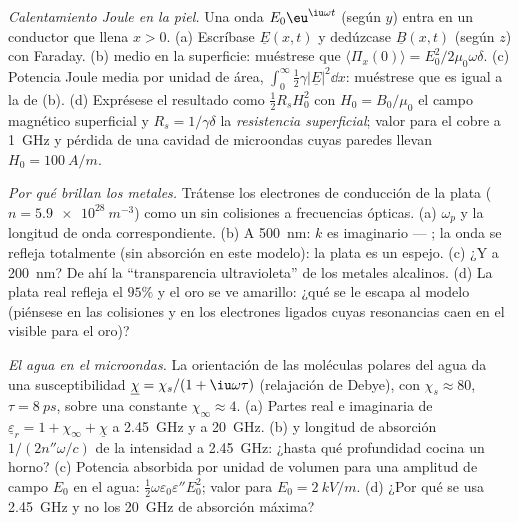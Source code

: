 \begin{exercise}[$\star\star\star$]\label{exo:b2:waves-in-media:10}
\emph{Calentamiento Joule en la piel.} Una onda $E_0\eu^{\iu\omega t}$ (según $y$)
entra en un conductor que llena $x > 0$. (a) Escríbase $\underline E(x, t)$ y dedúzcase
$\underline B(x, t)$ (según $z$) con Faraday. (b)  medio en la
superficie: muéstrese que $\langle\Pi_x(0)\rangle = E_0^2/2\mu_0\omega\delta$. (c) Potencia
Joule media por unidad de área, $\int_0^\infty\tfrac12\gamma|\underline E|^2\dd x$: muéstrese que es igual a
la de (b). (d) Exprésese el resultado como $\tfrac12R_sH_0^2$ con $H_0 = B_0/\mu_0$ el
campo magnético superficial y $R_s = 1/\gamma\delta$ la \emph{resistencia
superficial}; valor para el cobre a \qty{1}{GHz} y pérdida de una
cavidad de microondas cuyas paredes llevan $H_0 = \qty{100}{A/m}$.
\end{exercise}

\begin{exercise}[$\star\star\star$]\label{exo:b2:waves-in-media:11}
\emph{Por qué brillan los metales.} Trátense los electrones de conducción de la plata ($n =
\qty{5.9e28}{m^{-3}}$) como un  sin colisiones a frecuencias ópticas.
(a) $\omega_p$ y la longitud de onda correspondiente. (b) A \qty{500}{nm}: $k$ es
imaginario --- ; la onda se refleja totalmente (sin
absorción en este modelo): la plata es un espejo. (c) ¿Y a \qty{200}{nm}? De ahí
la ``transparencia ultravioleta'' de los metales alcalinos. (d) La plata real
refleja el $95\%$ y el oro se ve amarillo: ¿qué se le escapa al modelo (piénsese en
las colisiones y en los electrones ligados cuyas resonancias caen en el
visible para el oro)?
\end{exercise}

\begin{exercise}[$\star\star\star$]\label{exo:b2:waves-in-media:12}
\emph{El agua en el microondas.} La orientación de las moléculas polares
del agua da una susceptibilidad $\underline\chi = \chi_s/(1 + \iu\omega\tau)$ (relajación de Debye),
con $\chi_s \approx 80$, $\tau = \qty{8}{ps}$, sobre una constante
$\chi_\infty \approx 4$. (a) Partes real e imaginaria de $\underline\varepsilon_r = 1 + \chi_\infty
+ \underline\chi$ a \qty{2.45}{GHz} y a \qty{20}{GHz}. (b)  y longitud
de absorción $1/(2n''\omega/c)$ de la intensidad a \qty{2.45}{GHz}: ¿hasta qué
profundidad cocina un horno? (c) Potencia absorbida por unidad de volumen para una
amplitud de campo $E_0$ en el agua: $\tfrac12\omega\varepsilon_0\varepsilon''E_0^2$; valor para
$E_0 = \qty{2}{kV/m}$. (d) ¿Por qué se usa \qty{2.45}{GHz} y no los
\qty{20}{GHz} de absorción máxima?
\end{exercise}


